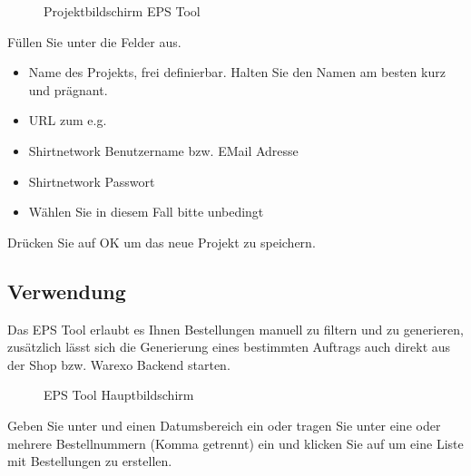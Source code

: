 \documentclass[letterpaper,10pt,ngerman]{sphinxmanual}
\begin{document}
\begin{figure}[htbp]
\centering
\capstart

\noindent{}
\caption{Projektbildschirm EPS Tool}\label{\detokenize{tools/epstool:id1}}\end{figure}

Füllen Sie unter  die Felder aus.
\begin{itemize}
\item {} 
 Name des Projekts, frei definierbar. Halten Sie den Namen am besten kurz und prägnant.

\item {} 
 URL zum {\hyperref[\detokenize{tools/backend::doc}]{}} e.g. 

\item {} 
 Shirtnetwork Benutzername bzw. E\sphinxhyphen{}Mail Adresse

\item {} 
 Shirtnetwork Passwort

\item {} 
 Wählen Sie in diesem Fall bitte unbedingt 

\end{itemize}

Drücken Sie auf OK um das neue Projekt zu speichern.


\subsection{Verwendung}
\label{\detokenize{tools/epstool:verwendung}}
Das EPS Tool erlaubt es Ihnen Bestellungen manuell zu filtern und zu generieren, zusätzlich lässt sich die Generierung
eines bestimmten Auftrags auch direkt aus der Shop bzw. Warexo Backend starten.

\begin{figure}[htbp]
\centering
\capstart

\noindent{}
\caption{EPS Tool Hauptbildschirm}\label{\detokenize{tools/epstool:id2}}\end{figure}

Geben Sie unter  und  einen Datumsbereich ein oder tragen Sie unter  eine
oder mehrere Bestellnummern (Komma getrennt) ein und klicken Sie auf  um eine Liste mit Bestellungen
zu erstellen.
\end{document}
